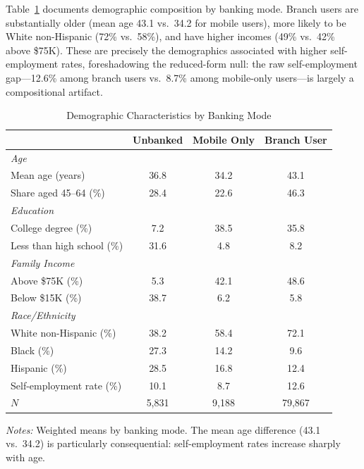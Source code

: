 \documentclass[12pt]{article}
\begin{document}
Table~\ref{tab:demographics} documents demographic composition by banking mode. Branch users are substantially older (mean age 43.1 vs.\ 34.2 for mobile users), more likely to be White non-Hispanic (72\% vs.\ 58\%), and have higher incomes (49\% vs.\ 42\% above \$75K). These are precisely the demographics associated with higher self-employment rates, foreshadowing the reduced-form null: the raw self-employment gap---12.6\% among branch users vs.\ 8.7\% among mobile-only users---is largely a compositional artifact.

\begin{table}[H]
\centering
\caption{Demographic Characteristics by Banking Mode}
\label{tab:demographics}
\begin{threeparttable}
\begin{tabular}{lccc}
\toprule
& Unbanked & Mobile Only & Branch User \\
\midrule
\multicolumn{4}{l}{\textit{Age}} \\
\quad Mean age (years) & 36.8 & 34.2 & 43.1 \\
\quad Share aged 45--64 (\%) & 28.4 & 22.6 & 46.3 \\
[4pt]
\multicolumn{4}{l}{\textit{Education}} \\
\quad College degree (\%) & 7.2 & 38.5 & 35.8 \\
\quad Less than high school (\%) & 31.6 & 4.8 & 8.2 \\
[4pt]
\multicolumn{4}{l}{\textit{Family Income}} \\
\quad Above \$75K (\%) & 5.3 & 42.1 & 48.6 \\
\quad Below \$15K (\%) & 38.7 & 6.2 & 5.8 \\
[4pt]
\multicolumn{4}{l}{\textit{Race/Ethnicity}} \\
\quad White non-Hispanic (\%) & 38.2 & 58.4 & 72.1 \\
\quad Black (\%) & 27.3 & 14.2 & 9.6 \\
\quad Hispanic (\%) & 28.5 & 16.8 & 12.4 \\
\midrule
Self-employment rate (\%) & 10.1 & 8.7 & 12.6 \\
$N$ & 5,831 & 9,188 & 79,867 \\
\bottomrule
\end{tabular}
\begin{tablenotes}
\small
\item \textit{Notes:} Weighted means by banking mode. The mean age difference (43.1 vs.\ 34.2) is particularly consequential: self-employment rates increase sharply with age.
\end{tablenotes}
\end{threeparttable}
\end{table}
\end{document}
